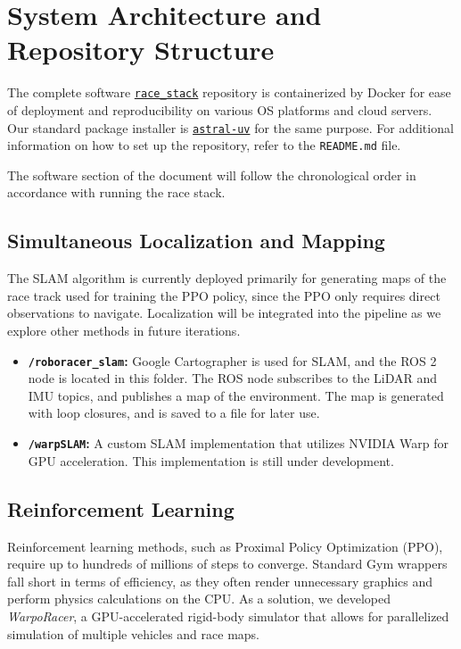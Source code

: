 \documentclass[11pt,letterpaper]{article}
\begin{document}
\section{System Architecture and Repository Structure}
The complete software \href{https://github.com/uci-f1tenth/race_stack}{\texttt{race\_stack}} repository is containerized by Docker for ease of deployment and reproducibility on various OS platforms and cloud servers.
Our standard package installer is \href{https://docs.astral.sh/uv/}{\texttt{astral-uv}} for the same purpose. For additional information on how to set up the repository, refer to the \texttt{README.md} file.

The software section of the document will follow the chronological order in accordance with running the race stack.

\subsection{Simultaneous Localization and Mapping}
The SLAM algorithm is currently deployed primarily for generating maps of the race track used for training the PPO policy, since the PPO only requires direct observations to navigate. 
Localization will be integrated into the pipeline as we explore other methods in future iterations.

\begin{itemize}
    \item \textbf{\texttt{/roboracer\_slam}:} Google Cartographer is used for SLAM, and the ROS 2 node is located in this folder. The ROS node subscribes to the LiDAR and IMU topics, and publishes a map of the environment. The map is generated with loop closures, and is saved to a file for later use.
    \item \textbf{\texttt{/warpSLAM}:} A custom SLAM implementation that utilizes NVIDIA Warp for GPU acceleration. This implementation is still under development.
\end{itemize}

\subsection{Reinforcement Learning}
Reinforcement learning methods, such as Proximal Policy Optimization (PPO), require up to hundreds of millions of steps to converge. Standard Gym wrappers fall short in terms of efficiency, as they often render unnecessary graphics and perform physics calculations on the CPU.
As a solution, we developed \textit{WarpoRacer}, a GPU-accelerated rigid-body simulator that allows for parallelized simulation of multiple vehicles and race maps.
\end{document}
